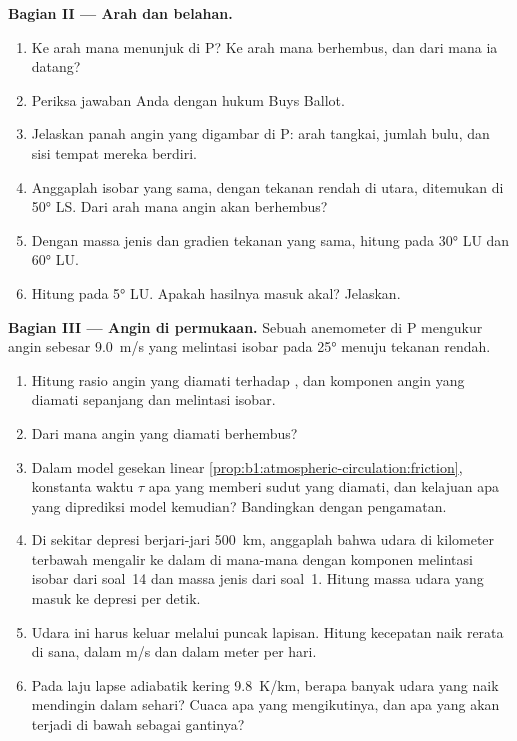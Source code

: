 \begin{problem}
\medskip
\noindent\textbf{Bagian II --- Arah dan belahan.}
\begin{enumerate}[resume]
  \item Ke arah mana  menunjuk di P? Ke arah mana  berhembus, dan dari  mana ia datang?
  \item Periksa jawaban Anda dengan hukum Buys Ballot.
  \item Jelaskan panah angin yang digambar di P: arah tangkai, jumlah bulu,
        dan sisi tempat mereka berdiri.
  \item Anggaplah isobar yang sama, dengan tekanan rendah di utara, ditemukan di
        \ang{50} LS. Dari arah mana angin akan berhembus?
  \item Dengan massa jenis dan gradien tekanan yang sama, hitung 
        pada \ang{30} LU dan \ang{60} LU.
  \item Hitung pada \ang{5} LU. Apakah hasilnya masuk akal? Jelaskan.
\end{enumerate}

\medskip
\noindent\textbf{Bagian III --- Angin di permukaan.} Sebuah anemometer di P mengukur angin
sebesar \qty{9.0}{m/s} yang melintasi isobar pada \ang{25} menuju tekanan rendah.
\begin{enumerate}[resume]
  \item Hitung rasio angin yang diamati terhadap , dan komponen
        angin yang diamati sepanjang dan melintasi isobar.
  \item Dari  mana angin yang diamati berhembus?
  \item Dalam model gesekan linear \cref{prop:b1:atmospheric-circulation:friction},
        konstanta waktu $\tau$ apa yang memberi sudut yang diamati, dan kelajuan apa
        yang diprediksi model kemudian? Bandingkan dengan pengamatan.
  \item Di sekitar depresi berjari-jari \qty{500}{km}, anggaplah bahwa udara di
        kilometer terbawah mengalir ke dalam di mana-mana dengan komponen melintasi isobar
        dari soal~14 dan massa jenis dari soal~1. Hitung massa udara yang masuk ke
        depresi per detik.
  \item Udara ini harus keluar melalui puncak lapisan. Hitung kecepatan naik rerata
        di sana, dalam \unit{m/s} dan dalam meter per hari.
  \item Pada laju lapse adiabatik kering \qty{9.8}{K/km}, berapa banyak udara yang naik
        mendingin dalam sehari? Cuaca apa yang mengikutinya, dan apa yang akan terjadi
        di bawah  sebagai gantinya?
\end{enumerate}


\end{problem}
